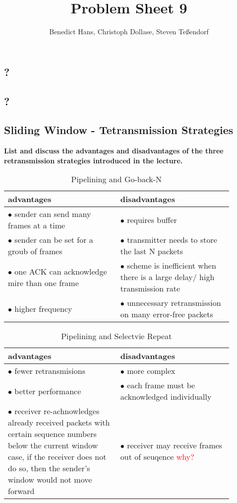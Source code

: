 \documentclass[a4paper,12pt]{article}
\author{Benedict Hans, Christoph Dollase, Steven Te\ss endorf}
\title{ \textbf{Problem Sheet 9}}
\newcommand*\red[1]{\textcolor{red}{#1}}
\begin{document}
	 
	\maketitle	 %
	
	\subsection{?}
	
	\subsection{?}
	
	\subsection{Sliding Window - Tetransmission Strategies}
	\textbf{List and discuss the advantages and disadvantages of the three retransmission strategies introduced in the lecture.}
	
	\begin{table}[h!]
		\caption{Pipelining and Go-back-N}
		\begin{tabular}{p{0.45\linewidth}|p{0.45\linewidth}}
			advantages & disadvantages \\ \hline
			$\bullet$ sender can send many frames at a time & $\bullet$ requires buffer \\ 
			$\bullet$ sender can be set for a groub of frames & $\bullet$ transmitter needs to store the last N packets\\
			$\bullet$ one ACK can acknowledge mire than one frame & $\bullet$ scheme is inefficient when there is a large delay/ high transmission rate\\
			$\bullet$ higher frequency & $\bullet$ unnecessary retransmission on many error-free packets \\			
		\end{tabular}
	\end{table}

	\begin{table}[h!]
		\caption{Pipelining and Selectvie Repeat}
		\begin{tabular}{p{0.45\linewidth}|p{0.45\linewidth}}
			advantages & disadvantages \\ \hline
			$\bullet$ fewer retransmisions &  $\bullet$ more complex\\
			$\bullet$ better performance & $\bullet$ each frame must be acknowledged individually\\
			$\bullet$ receiver re-achnowledges already received packets with certain sequence numbers below the current window case, if the receiver does not do so, then the sender's window would not move forward & $\bullet$ receiver may receive frames out of seuqence  \red{why?} \\
		\end{tabular}
	\end{table}
\end{document}
